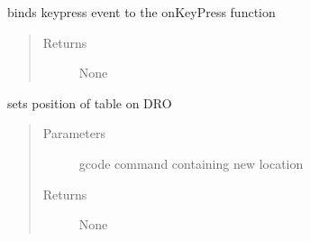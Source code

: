 \documentclass[letterpaper,10pt,english]{sphinxmanual}
\begin{document}
\begin{fulllineitems}
\begin{fulllineitems}
\begin{quote}
\begin{description}
\end{description}\end{quote}

\end{fulllineitems}


\begin{fulllineitems}
\label{\detokenize{index:droogCNC.TwoAxisStage.setKeybinds}}
\sphinxAtStartPar
binds keypress event to the onKeyPress function
\begin{quote}\begin{description}
\item[{Returns}] \leavevmode
\sphinxAtStartPar
None

\end{description}\end{quote}

\end{fulllineitems}


\begin{fulllineitems}
\label{\detokenize{index:droogCNC.TwoAxisStage.setPos}}
\sphinxAtStartPar
sets position of table on DRO
\begin{quote}\begin{description}
\item[{Parameters}] \leavevmode
\sphinxAtStartPar
{} \textendash{} gcode command containing new location

\item[{Returns}] \leavevmode
\sphinxAtStartPar
None

\end{description}\end{quote}

\end{fulllineitems}


\begin{fulllineitems}
\label{\detokenize{index:droogCNC.TwoAxisStage.start}}
\end{fulllineitems}


\end{fulllineitems}
\end{document}
